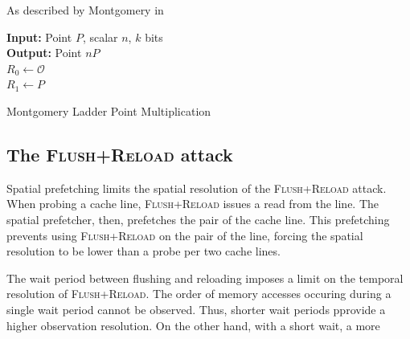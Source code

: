 \documentclass{llncs}
\begin{document}
As described by Montgomery in \cite{montgomery87speeding}

\begin{algorithm}[htb]
 \SetAlgoLined
{\bf Input:} Point $P$, scalar $n$, $k$ bits\\
{\bf Output:} Point $nP$\\
$R_0\gets \mathcal{O}$\\
$R_1\gets P$\\
 \caption{Montgomery Ladder Point Multiplication}
\end{algorithm}

\subsection{The \textsc{Flush+Reload} attack}

Spatial prefetching limits the spatial resolution of the \textsc{Flush+Reload} attack.
When probing a cache line, \textsc{Flush+Reload} issues a read from the line.  
The spatial prefetcher, then, prefetches the pair of the cache line. 
This prefetching prevents using \textsc{Flush+Reload} on the pair of the line,
forcing the spatial resolution to be lower than a probe per two cache lines.

The wait period between flushing and reloading imposes a limit on the temporal resolution of \textsc{Flush+Reload}.
The order of memory accesses occuring during a single wait period cannot be observed.
Thus, shorter wait periods pprovide a higher observation resolution.
On the other hand, with a short wait, a more 
\end{document}
